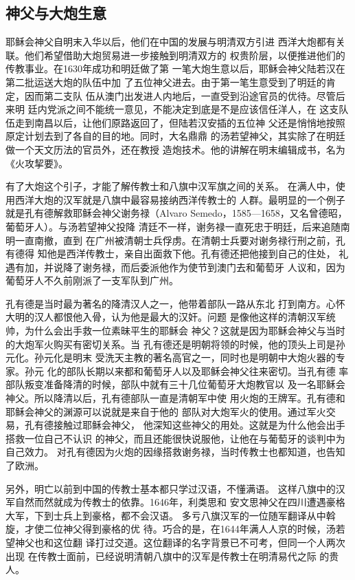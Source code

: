 \subsection{神父与大炮生意}
\par
耶稣会神父自明末入华以后，他们在中国的发展与明清双方引进%
西洋大炮都有关联。他们希望借助大炮贸易进一步接触到明清双方的%
权贵阶层，以便推进他们的传教事业。在1630年成功和明廷做了第%
一笔大炮生意以后，耶稣会神父陆若汉在第二批运送大炮的队伍中加%
了五位神父进去。由于第一笔生意受到了明廷的肯定，因而第二支队%
伍从澳门出发进人内地后，一直受到沿途官员的优待。尽管后来明%
廷内党派之间不能统一意见，不能决定到底是不是应该信任洋人，在%
这支队伍走到南昌以后，让他们原路返回了，但陆若汉安插的五位神%
父还是悄悄地按照原定计划去到了各自的目的地。同时，大名鼎鼎%
的汤若望神父，其实除了在明廷做一个天文历法的官员外，还在教授%
造炮技术。他的讲解在明末编辑成书，名为《火攻挈要》。%
\par
有了大炮这个引子，才能了解传教士和八旗中汉军旗之间的关系。%
在满人中，使用西洋大炮的汉军就是八旗中最容易接纳西洋传教士的%
人群。最明显的一个例子就是孔有德解救耶稣会神父谢务禄（Alvaro%
\space%
Semedo，1585—1658，又名曾德昭，葡萄牙人）。与汤若望神父投降%
清廷不一样，谢务禄一直死忠于明廷，后来追随南明一直南撤，直到%
在广州被清朝士兵俘虏。在清朝士兵要对谢务禄行刑之前，孔有德得%
知他是西洋传教士，亲自出面救下他。孔有德还把他接到自己的住处，%
礼遇有加，并说降了谢务禄，而后委派他作为使节到澳门去和葡萄牙%
人议和，因为葡萄牙人不久前刚派了一支军队到广州。%
\par
孔有德是当时最为著名的降清汉人之一，他带着部队一路从东北%
打到南方。心怀大明的汉人都恨他入骨，认为他是最大的汉奸。问题%
是像他这样的清朝汉军统帅，为什么会出手救一位素昧平生的耶稣会%
神父？这就是因为耶稣会神父与当时的大炮军火购买有密切关系。当%
孔有德还是明朝将领的时候，他的顶头上司是孙元化。孙元化是明末%
受洗天主教的著名高官之一，同时也是明朝中大炮火器的专家。孙元%
化的部队长期以来都和葡萄牙人以及耶稣会神父往来密切。当孔有德%
率部队叛变准备降清的时候，部队中就有三十几位葡萄牙大炮教官以%
及一名耶稣会神父。所以降清以后，孔有德部队一直是清朝军中使%
用火炮的王牌军。孔有德和耶稣会神父的渊源可以说就是来自于他的%
部队对大炮军火的使用。通过军火交易，孔有德接触过耶稣会神父，%
他深知这些神父的用处。这就是为什么他会出手搭救一位自己不认识%
的神父，而且还能很快说服他，让他在与葡萄牙的谈判中为自己效力。%
对孔有德因为火炮的因缘搭救谢务禄，当时传教士也都知道，也告知%
了欧洲。%
\par
另外，明亡以前到中国的传教士基本都只学过汉语，不懂满语。%
这样八旗中的汉军自然而然就成为传教士的依靠。1646年，利类思和%
安文思神父在四川遭遇豪格大军，下到士兵上到豪格，都不会汉语。%
多亏八旗汉军的一位随军翻译从中斡旋，才使二位神父得到豪格的优%
待。巧合的是，在1644年满人人京的时候，汤若望神父也和这位翻%
译打过交道。这位翻译的名字背景已不可考，但同一个人两次出现%
在传教士面前，已经说明清朝八旗中的汉军是传教士在明清易代之际%
的贵人。%
